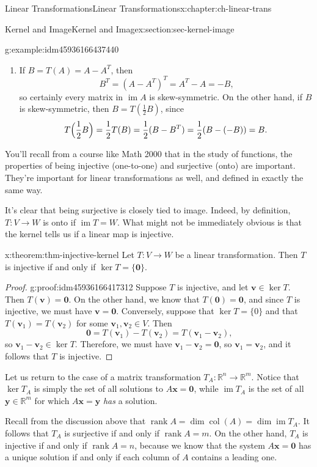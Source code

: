 \documentclass[oneside,10pt,]{book}
\numberwithin{equation}{section}
\newcommand{\R}{\mathbb{R}}
\newcommand{\im}{\operatorname{im}}
\newcommand{\csp}{\operatorname{col}}
\newcommand{\rank}{\operatorname{rank}}
\newcommand{\vv}{\mathbf{v}}
\newcommand{\xx}{\mathbf{x}}
\newcommand{\yy}{\mathbf{y}}
\begin{document}
\begin{chapterptx}{Linear Transformations}{}{Linear Transformations}{}{}{x:chapter:ch-linear-trans}
\begin{sectionptx}{Kernel and Image}{}{Kernel and Image}{}{}{x:section:sec-kernel-image}
\begin{example}{}{g:example:idm45936166437440}
\begin{enumerate}
\item{}If \(B=T(A)=A-A^T\), then%
\begin{equation*}
B^T = (A-A^T)^T = A^T-A = -B\text{,}
\end{equation*}
so certainly every matrix in \(\im A\) is skew-symmetric. On the other hand, if \(B\) is skew-symmetric, then \(B=T(\frac12 B)\), since%
\begin{equation*}
T\Bigl(\frac12 B\Bigr) = \frac12 T(B) = \frac12(B-B^T) = \frac12(B-(-B))= B\text{.}
\end{equation*}
%
\end{enumerate}
%
\end{example}
You'll recall from a course like Math 2000 that in the study of functions, the properties of being injective (one-to-one) and surjective (onto) are important. They're important for linear transformations as well, and defined in exactly the same way.%
\par
It's clear that being surjective is closely tied to image. Indeed, by definition, \(T:V\to W\) is onto if \(\im T = W\). What might not be immediately obvious is that the kernel tells us if a linear map is injective.%
\begin{theorem}{}{}{x:theorem:thm-injective-kernel}%
Let \(T:V\to W\) be a linear transformation. Then \(T\) is injective if and only if \(\ker T = \{\mathbf{0}\}\).%
\end{theorem}
\begin{proof}{}{g:proof:idm45936166417312}
Suppose \(T\) is injective, and let \(\vv\in \ker T\). Then \(T(\vv)=\mathbf{0}\). On the other hand, we know that \(T(\mathbf{0})=\mathbf{0}\), and since \(T\) is injective, we must have \(\vv=\mathbf{0}\). Conversely, suppose that \(\ker T = \{0\}\) and that \(T(\vv_1)=T(\vv_2)\) for some \(\vv_1,\vv_2\in V\). Then%
\begin{equation*}
\mathbf{0} = T(\vv_1)-T(\vv_2) = T(\vv_1-\vv_2)\text{,}
\end{equation*}
so \(\vv_1-\vv_2\in \ker T\). Therefore, we must have \(\vv_1-\vv_2=\mathbf{0}\), so \(\vv_1=\vv_2\), and it follows that \(T\) is injective.%
\end{proof}
Let us return to the case of a matrix transformation \(T_A:\R^n\to \R^m\). Notice that \(\ker T_A\) is simply the set of all solutions to \(A\xx=\mathbf{0}\), while \(\im T_A\) is the set of all \(\yy\in\R^m\) for which \(A\xx=\yy\) \emph{has} a solution.%
\par
Recall from the discussion above that \(\rank A = \dim \csp(A) = \dim \im T_A\). It follows that \(T_A\) is surjective if and only if \(\rank A = m\). On the other hand, \(T_A\) is injective if and only if \(\rank A = n\), because we know that the system \(A\xx=\mathbf{0}\) has a unique solution if and only if each column of \(A\) contains a leading one.%

\end{sectionptx}
\end{chapterptx}
\end{document}
